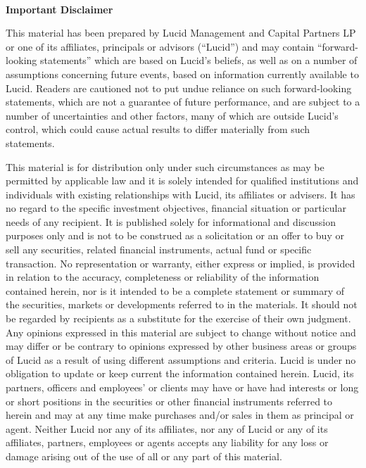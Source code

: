 \documentclass[9pt]{article}
\begin{document}
\pagebreak

 \ \\
  \ \\
  \ \\
   \ \\
  \ \\
  \ \\

\noindent\textbf{\color{lucid_blue}Important Disclaimer}

\small

\noindent This material has been prepared by Lucid Management and Capital Partners LP or one of its affiliates, principals or advisors (``Lucid'') and may contain ``forward-looking statements'' which are based on Lucid's beliefs, as well as on a number of assumptions concerning future events, based on information currently available to Lucid. Readers are cautioned not to put undue reliance on such forward-looking statements, which are not a guarantee of future performance, and are subject to a number of uncertainties and other factors, many of which are outside Lucid's control, which could cause actual results to differ materially from such statements.

\noindent This material is for distribution only under such circumstances as may be permitted by applicable law and it is solely intended for qualified institutions and individuals with existing relationships with Lucid, its affiliates or advisers.  It has no regard to the specific investment objectives, financial situation or particular needs of any recipient. It is published solely for informational and discussion purposes only and is not to be construed as a solicitation or an offer to buy or sell any securities, related financial instruments, actual fund or specific transaction. No representation or warranty, either express or implied, is provided in relation to the accuracy, completeness or reliability of the information contained herein, nor is it intended to be a complete statement or summary of the securities, markets or developments referred to in the materials.  It should not be regarded by recipients as a substitute for the exercise of their own judgment. Any opinions expressed in this material are subject to change without notice and may differ or be contrary to opinions expressed by other business areas or groups of Lucid as a result of using different assumptions and criteria. Lucid is under no obligation to update or keep current the information contained herein. Lucid, its partners, officers and employees' or clients may have or have had interests or long or short positions in the securities or other financial instruments referred to herein and may at any time make purchases and/or sales in them as principal or agent. Neither Lucid nor any of its affiliates, nor any of Lucid or any of its affiliates, partners, employees or agents accepts any liability for any loss or damage arising out of the use of all or any part of this material.
\end{document}
